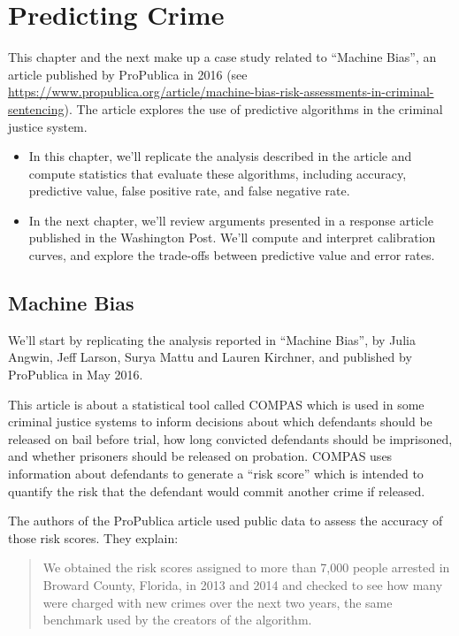 \hypertarget{predicting-crime}{%
\chapter{Predicting Crime}\label{predicting-crime}}

This chapter and the next make up a case study related to ``Machine
Bias'', an article published by ProPublica in 2016 (see
\url{https://www.propublica.org/article/machine-bias-risk-assessments-in-criminal-sentencing}).
The article explores the use of predictive algorithms in the criminal
justice system.

\begin{itemize}
\item
  In this chapter, we'll replicate the analysis described in the article
  and compute statistics that evaluate these algorithms, including
  accuracy, predictive value, false positive rate, and false negative
  rate.
\item
  In the next chapter, we'll review arguments presented in a response
  article published in the Washington Post. We'll compute and interpret
  calibration curves, and explore the trade-offs between predictive
  value and error rates.
\end{itemize}

\hypertarget{machine-bias}{%
\section{Machine Bias}\label{machine-bias}}

We'll start by replicating the analysis reported in ``Machine Bias'', by
Julia Angwin, Jeff Larson, Surya Mattu and Lauren Kirchner, and
published by ProPublica in May 2016.

This article is about a statistical tool called COMPAS which is used in
some criminal justice systems to inform decisions about which defendants
should be released on bail before trial, how long convicted defendants
should be imprisoned, and whether prisoners should be released on
probation. COMPAS uses information about defendants to generate a ``risk
score'' which is intended to quantify the risk that the defendant would
commit another crime if released.

The authors of the ProPublica article used public data to assess the
accuracy of those risk scores. They explain:

\begin{quote}
We obtained the risk scores assigned to more than 7,000 people arrested
in Broward County, Florida, in 2013 and 2014 and checked to see how many
were charged with new crimes over the next two years, the same benchmark
used by the creators of the algorithm.
\end{quote}

